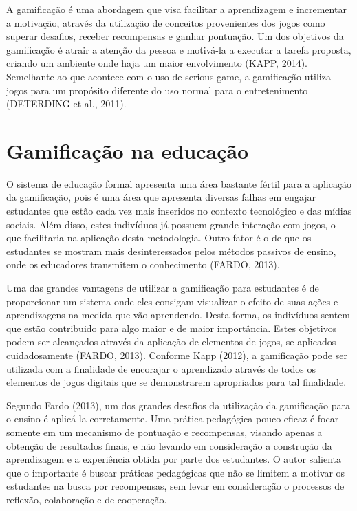 \documentclass[
	12pt,				%
	oneside,			%
	a4paper,			%
	english,			%
	french,				%
	spanish,			%
	brazil,				%
	]{abntex2}
\begin{document}
A gamificação é uma abordagem que visa facilitar a aprendizagem e incrementar a motivação, através da utilização de conceitos provenientes dos jogos como superar desafios, receber recompensas e ganhar pontuação. Um dos objetivos da gamificação é atrair a atenção da pessoa e motivá-la a executar a tarefa proposta, criando um ambiente onde haja um maior envolvimento (KAPP, 2014). Semelhante ao que acontece com o uso de serious game, a gamificação utiliza jogos para um propósito diferente do uso normal para o entretenimento (DETERDING et al., 2011).

\section{Gamificação na educação}

O sistema de educação formal apresenta uma área bastante fértil para a aplicação da gamificação, pois é uma área que apresenta diversas falhas em engajar estudantes que estão cada vez mais inseridos no contexto tecnológico e das mídias sociais. Além disso, estes indivíduos já possuem grande interação com jogos, o que facilitaria na aplicação desta metodologia. Outro fator é o de que os estudantes se mostram mais desinteressados pelos métodos passivos de ensino, onde os educadores transmitem o conhecimento (FARDO, 2013). 

Uma das grandes vantagens de utilizar a gamificação para estudantes é de proporcionar um sistema onde eles consigam visualizar o efeito de suas ações e aprendizagens na medida que vão aprendendo. Desta forma, os indivíduos sentem que estão contribuido para algo maior e de maior importância. Estes objetivos podem ser alcançados através da aplicação de elementos de jogos, se aplicados cuidadosamente (FARDO, 2013). Conforme Kapp (2012), a gamificação pode ser utilizada com a finalidade de encorajar o aprendizado através de todos os elementos de jogos digitais que se demonstrarem apropriados para tal finalidade.  

Segundo Fardo (2013), um dos grandes desafios da utilização da gamificação para o ensino é aplicá-la corretamente. Uma prática pedagógica pouco eficaz é focar somente em um mecanismo de pontuação e recompensas, visando apenas a obtenção de resultados finais, e não levando em consideração a construção da aprendizagem e a experiência obtida por parte dos estudantes. O autor salienta que o importante é buscar práticas pedagógicas que não se limitem a motivar os estudantes na busca por recompensas, sem levar em consideração o processos de reflexão, colaboração e de cooperação.
\end{document}
